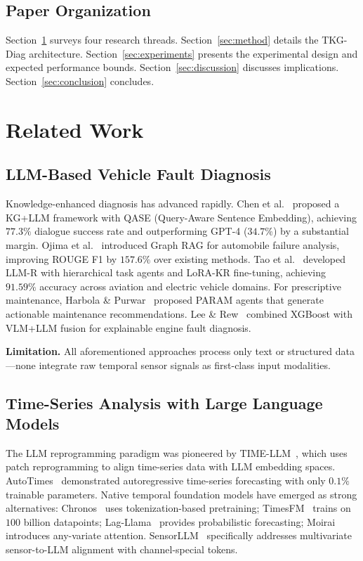 \documentclass[11pt,a4paper]{article}
\begin{document}
\subsection{Paper Organization}\label{sec:org}

Section~\ref{sec:related} surveys four research threads. Section~\ref{sec:method} details the TKG-Diag architecture. Section~\ref{sec:experiments} presents the experimental design and expected performance bounds. Section~\ref{sec:discussion} discusses implications. Section~\ref{sec:conclusion} concludes.

\section{Related Work}\label{sec:related}

\subsection{LLM-Based Vehicle Fault Diagnosis}\label{sec:rw:diag}

Knowledge-enhanced diagnosis has advanced rapidly. Chen et al.~\cite{chen2025kgllm} proposed a KG+LLM framework with QASE (Query-Aware Sentence Embedding), achieving $77.3\%$ dialogue success rate and outperforming GPT-4 ($34.7\%$) by a substantial margin. Ojima et al.~\cite{ojima2024graphrag} introduced Graph RAG for automobile failure analysis, improving ROUGE F1 by $157.6\%$ over existing methods. Tao et al.~\cite{tao2024llmr} developed LLM-R with hierarchical task agents and LoRA-KR fine-tuning, achieving $91.59\%$ accuracy across aviation and electric vehicle domains. For prescriptive maintenance, Harbola \& Purwar~\cite{harbola2025param} proposed PARAM agents that generate actionable maintenance recommendations. Lee \& Rew~\cite{lee2026drive} combined XGBoost with VLM+LLM fusion for explainable engine fault diagnosis.

\textbf{Limitation.} All aforementioned approaches process only text or structured data---none integrate raw temporal sensor signals as first-class input modalities.

\subsection{Time-Series Analysis with Large Language Models}\label{sec:rw:ts}

The LLM reprogramming paradigm was pioneered by TIME-LLM~\cite{jin2024timellm}, which uses patch reprogramming to align time-series data with LLM embedding spaces. AutoTimes~\cite{liu2024autotimes} demonstrated autoregressive time-series forecasting with only $0.1\%$ trainable parameters. Native temporal foundation models have emerged as strong alternatives: Chronos~\cite{ansari2024chronos} uses tokenization-based pretraining; TimesFM~\cite{das2024timesfm} trains on $100$ billion datapoints; Lag-Llama~\cite{rasul2023lagllama} provides probabilistic forecasting; Moirai~\cite{liu2024moirai} introduces any-variate attention. SensorLLM~\cite{li2025sensorllm} specifically addresses multivariate sensor-to-LLM alignment with channel-special tokens.
\end{document}
